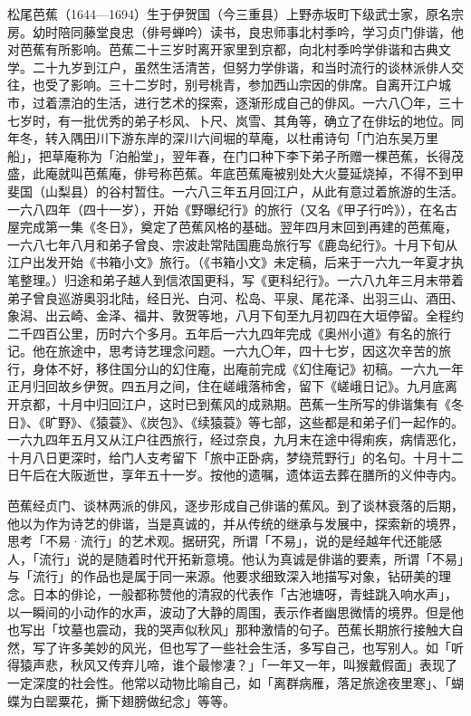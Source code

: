 {\FS
    松尾芭蕉（1644—1694）生于伊贺国（今三重县）上野赤坂町下级武士家，原名宗房。幼时陪同藤堂良忠（俳号蝉吟）读书，良忠师事北村季吟，学习贞门俳谐，他对芭蕉有所影响。芭蕉二十三岁时离开家里到京都，向北村季吟学俳谐和古典文学。二十九岁到江户，虽然生活清苦，但努力学俳谐，和当时流行的谈林派俳人交往，也受了影响。三十二岁时，别号桃青，参加西山宗因的俳席。自离开江户城市，过着漂泊的生活，进行艺术的探索，逐渐形成自己的俳风。一六八〇年，三十七岁时，有一批优秀的弟子杉风、卜尺、岚雪、其角等，确立了在俳坛的地位。同年冬，转入隅田川下游东岸的深川六间堀的草庵，以杜甫诗句「门泊东吴万里船」，把草庵称为「泊船堂」，翌年春，在门口种下李下弟子所赠一棵芭蕉，长得茂盛，此庵就叫芭蕉庵，俳号称芭蕉。年底芭蕉庵被别处大火蔓延烧掉，不得不到甲斐国（山梨县）的谷村暂住。一六八三年五月回江户，从此有意过着旅游的生活。一六八四年（四十一岁），开始《野曝纪行》的旅行（又名《甲子行吟》），在名古屋完成第一集《冬日》，奠定了芭蕉风格的基础。翌年四月末回到再建的芭蕉庵，一六八七年八月和弟子曾良、宗波赴常陆国鹿岛旅行写《鹿岛纪行》。十月下旬从江户出发开始《书箱小文》旅行。（《书箱小文》未定稿，后来于一六九一年夏才执笔整理。）归途和弟子越人到信浓国更科，写《更科纪行》。一六八九年三月末带着弟子曾良巡游奥羽北陆，经日光、白河、松岛、平泉、尾花泽、出羽三山、酒田、象潟、出云崎、金泽、福井、敦贺等地，八月下旬至九月初四在大垣停留。全程约二千四百公里，历时六个多月。五年后一六九四年完成《奥州小道》有名的旅行记。他在旅途中，思考诗艺理念问题。一六九〇年，四十七岁，因这次辛苦的旅行，身体不好，移住国分山的幻住庵，出庵前完成《幻住庵记》初稿。一六九一年正月归回故乡伊贺。四五月之间，住在嵯峨落柿舍，留下《嵯峨日记》。九月底离开京都，十月中归回江户，这时已到蕉风的成熟期。芭蕉一生所写的俳谐集有《冬日》、《旷野》、《猿蓑》、《炭包》、《续猿蓑》等七部，这些都是和弟子们一起作的。一六九四年五月又从江户往西旅行，经过奈良，九月末在途中得痢疾，病情恶化，十月八日更深时，给门人支考留下「旅中正卧病，梦绕荒野行」的名句。十月十二日午后在大阪逝世，享年五十一岁。按他的遗嘱，遗体运去葬在膳所的义仲寺内。

    芭蕉经贞门\footnotemark[1]、谈林\footnotemark[2]两派的俳风，逐步形成自己俳谐的蕉风。到了谈林衰落的后期，他以为作为诗艺的俳谐，当是真诚的，并从传统的继承与发展中，探索新的境界，思考「不易·流行」的艺术观。据研究，所谓「不易」，说的是经越年代还能感人，「流行」说的是随着时代开拓新意境。他认为真诚是俳谐的要素，所谓「不易」与「流行」的作品也是属于同一来源。他要求细致深入地描写对象，钻研美的理念。日本的俳论，一般都称赞他的清寂的代表作「古池塘呀，青蛙跳入响水声」，以一瞬间的小动作的水声，波动了大静的周围，表示作者幽思微情的境界。但是他也写出「坟墓也震动，我的哭声似秋风」那种激情的句子。芭蕉长期旅行接触大自然，写了许多美妙的风光，但也写了一些社会生活，多写自己，也写别人。如「听得猿声悲，秋风又传弃儿啼，谁个最惨凄？」「一年又一年，叫猴戴假面」表现了一定深度的社会性。他常以动物比喻自己，如「离群病雁，落足旅途夜里寒」、「蝴蝶为白罂粟花，撕下翅膀做纪念」等等。

}
